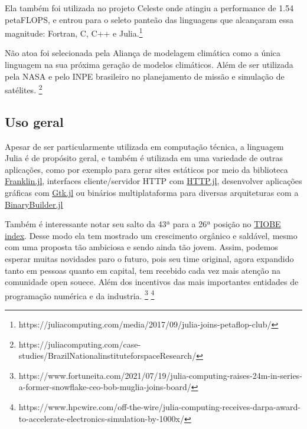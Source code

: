 Ela também foi utilizada no projeto Celeste onde atingiu a performance de 1.54 petaFLOPS, e entrou para o seleto panteão das linguagens que alcançaram essa magnitude: Fortran, C, C++ e Julia.\footnote{https://juliacomputing.com/media/2017/09/julia-joins-petaflop-club/}

Não atoa foi selecionada pela Aliança de modelagem climática como a única linguagem na sua próxima geração de modelos climáticos. Além de ser utilizada pela NASA e pelo INPE brasileiro no planejamento de missão e simulação de satélites. \footnote{https://juliacomputing.com/case-studies/BrazilNationalinstituteforspaceResearch/}



\subsection{Uso geral}

Apesar de ser particularmente utilizada em computação técnica, a linguagem Julia é de propósito geral, e também é utilizada em uma variedade de outras aplicações, como por exemplo para gerar sites estáticos por meio da biblioteca \href{http://franklinjl.org/)}{Franklin.jl}, interfaces cliente/servidor HTTP com \href{https://github.com/JuliaWeb/HTTP.jl}{HTTP.jl}, desenvolver aplicações gráficas com \href{https://github.com/JuliaGraphics/Gtk.jl}{Gtk.jl} ou binários multiplataforma para diversas arquiteturas com a \href{http://binarybuilder.org/}{BinaryBuilder.jl}

Também é interessante notar seu salto da 43ª para a 26ª posição no \href{https://www.tiobe.com/tiobe-index/}{TIOBE index}. 
Desse modo ela tem mostrado um crescimento orgânico e saldável, mesmo com uma proposta tão ambiciosa e sendo ainda tão jovem. Assim, podemos esperar muitas novidades paro o futuro, pois seu time original, agora expandido tanto em pessoas quanto em capital, tem recebido cada vez mais atenção na comunidade open souece. Além dos incentivos das mais importantes entidades de programação numérica e da industria. \footnote{https://www.fortuneita.com/2021/07/19/julia-computing-raises-24m-in-series-a-former-snowflake-ceo-bob-muglia-joins-board/} \footnote{https://www.hpcwire.com/off-the-wire/julia-computing-receives-darpa-award-to-accelerate-electronics-simulation-by-1000x/}




